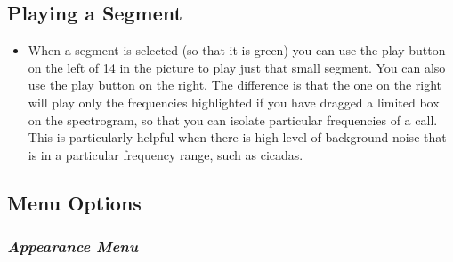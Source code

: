 \documentclass{article}
\begin{document}
\subsection{Playing a Segment}

\begin{itemize}
\item When a segment is selected (so that it is green) you can use the play button on the left of 14 in the picture to play just that small segment. You can also use the play button on the right. The difference is that the one on the right will play only the frequencies highlighted if you have dragged a limited box on the spectrogram, so that you can isolate particular frequencies of a call. This is particularly helpful when there is high level of background noise that is in a particular frequency range, such as cicadas.
\end{itemize}

\subsection{Menu Options}	

\subsubsection{{\em Appearance Menu}}
\end{document}
